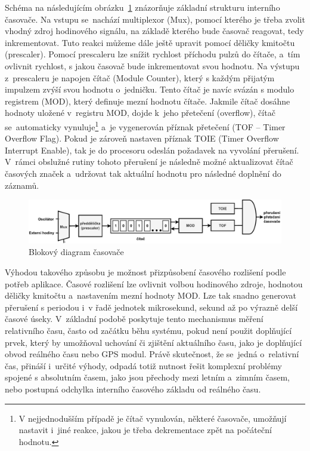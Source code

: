 Schéma na následujícím obrázku~\ref{fig:timer} znázorňuje základní strukturu interního časovače. Na vstupu se~nachází multiplexor (Mux), pomocí kterého je třeba zvolit vhodný zdroj hodinového signálu, na základě kterého bude časovač reagovat, tedy inkrementovat. Tuto reakci můžeme dále ještě upravit pomocí děličky kmitočtu (prescaler). Pomocí prescaleru lze snížit rychlost příchodu pulzů do čítače, a~tím ovlivnit rychlost, s jakou časovač bude inkrementovat svou hodnotu. Na výstupu z~prescaleru je napojen čítač (Module Counter), který s každým přijatým impulzem zvýší svou hodnotu o~jedničku. Tento čítač je navíc svázán s modulo registrem (MOD), který definuje mezní hodnotu čítače. Jakmile čítač dosáhne hodnoty uložené v~registru MOD, dojde k~jeho přetečení (overflow), čítač se~automaticky vynuluje\footnote{V nejjednodušším případě je čítač vynulován, některé časovače, umožňují nastavit i~jiné reakce, jakou je třeba dekrementace zpět na počáteční hodnotu.} a~je vygenerován příznak přetečení (TOF -- Timer Overflow Flag). Pokud je zároveň nastaven příznak TOIE (Timer Overflow Interrupt Enable), tak je do procesoru odeslán požadavek na vyvolání přerušení. V~rámci obslužné rutiny tohoto přerušení je následně možné aktualizovat čítač časových značek a~udržovat tak aktuální hodnotu pro následné doplnění do záznamů.~\cite{nxp_KL05_Reference_Manual}

\newpage

\begin{figure}[h]
    \centering
    \includegraphics[width=1.00\textwidth]{obrazky-figures/timer-cz.pdf}
    
    \caption{Blokový diagram časovače~\cite{nxp_KL05_Reference_Manual}}
    \label{fig:timer}
\end{figure}

Výhodou takového způsobu je možnost přizpůsobení časového rozlišení podle potřeb aplikace. Časové rozlišení lze ovlivnit volbou hodinového zdroje, hodnotou děličky kmitočtu a~nastavením mezní hodnoty MOD. Lze tak snadno generovat přerušení s periodou i~v řadě jednotek mikrosekund, sekund až po výrazně delší časové úseky. V~základní podobě poskytuje tento mechanismus měření relativního času, často od začátku běhu systému, pokud není použit doplňující prvek, který by umožňoval uchování či zjištění aktuálního času, jako je doplňující obvod reálného času nebo GPS modul. Právě skutečnost, že se~jedná o~relativní čas, přináší i~určité výhody, odpadá totiž nutnost řešit komplexní problémy spojené s absolutním časem, jako jsou přechody mezi letním a~zimním časem, nebo postupná odchylka interního časového základu od reálného času.~\cite{perny2008zarizeni_cas_znacky}

